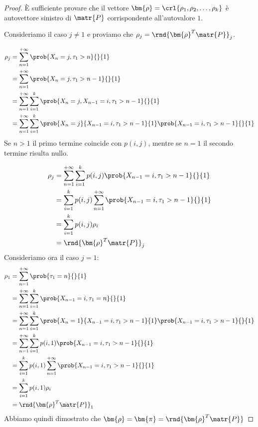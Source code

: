 \documentclass[\main/main.tex]{subfiles}
\begin{document}
\begin{proof}
	È sufficiente provare che il vettore \(\bm{\rho} = \crl{\rho_1, \rho_2, \ldots, \rho_k}\) è autovettore sinistro di \(\matr{P}\) corrispondente all'autovalore \(1\).

	Consideriamo il caso \(j \neq 1\) e proviamo che \(\rho_j = \rnd{\bm{\rho}^T\matr{P}}_j\).

	\begin{align*}
		\rho_j & = \sum_{n=1}^{+\infty} \prob{X_n = j, \tau_1 > n}{}{1}                                                                  \\
		       & = \sum_{n=1}^{+\infty} \prob{X_n = j, \tau_1 > n-1}{}{1}                                                                \\
		       & = \sum_{n=1}^{+\infty} \sum_{i=1}^{k} \prob{X_n = j, X_{n-1} = i, \tau_1 > n-1}{}{1}                                    \\
		       & = \sum_{n=1}^{+\infty} \sum_{i=1}^{k} \prob{X_n = j}{X_{n-1} = i, \tau_1 > n-1}{1}\prob{X_{n-1} = i, \tau_1 > n-1}{}{1} \\
	\end{align*}
	Se \(n>1\) il primo termine coincide con \(p(i,j)\), mentre se \(n=1\) il secondo termine risulta nullo.

	\begin{align*}
		\rho_j & = \sum_{n=1}^{+\infty} \sum_{i=1}^{k} p(i,j) \prob{X_{n-1} = i, \tau_1 > n-1}{}{1}  \\
		       & = \sum_{i=1}^{k} p(i,j)  \sum_{n=1}^{+\infty} \prob{X_{n-1} = i, \tau_1 > n-1}{}{1} \\
		       & = \sum_{i=1}^{k} p(i,j) \rho_i                                                      \\
		       & = \rnd{\bm{\rho}^T \matr{P}}_j
	\end{align*}
	Consideriamo ora il caso \(j=1\):
	\begin{align*}
		\rho_1 & = \sum_{n=1}^{+\infty} \prob{\tau_1 = n}{}{1}                                                                           \\
		       & = \sum_{n=1}^{+\infty} \sum_{i=1}^{k} \prob{X_{n-1} = i, \tau_1 = n}{}{1}                                               \\
		       & = \sum_{n=1}^{+\infty} \sum_{i=1}^{k} \prob{X_n = 1}{X_{n-1} = i, \tau_1 > n-1}{1}\prob{X_{n-1} = i, \tau_1 > n-1}{}{1} \\
		       & = \sum_{n=1}^{+\infty} \sum_{i=1}^{k} p(i,1)\prob{X_{n-1} = i, \tau_1 > n-1}{}{1}                                       \\
		       & = \sum_{i=1}^{k} p(i,1) \sum_{n=1}^{+\infty} \prob{X_{n-1} = i, \tau_1 > n-1}{}{1}                                      \\
		       & = \sum_{i=1}^{k} p(i,1) \rho_i                                                                                          \\
		       & = \rnd{\bm{\rho}^T \matr{P}}_1
	\end{align*}
	Abbiamo quindi dimostrato che \(\bm{\rho} = \bm{\pi} = \rnd{\bm{\rho}^T\matr{P}}\)
\end{proof}
\end{document}

